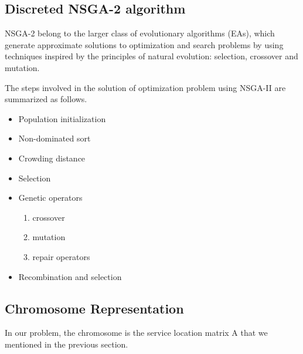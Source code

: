 \documentclass[twoside]{article}
\begin{document}
\subsection{Discreted NSGA-2 algorithm}
NSGA-2 belong to the larger class of evolutionary algorithms (EAs), which generate approximate solutions to 
optimization and search problems by using techniques inspired by the principles of natural 
evolution: selection, crossover and mutation.

The steps involved in the solution of optimization problem using NSGA-II are summarized as follows.
\begin{itemize}
	\item Population initialization
	\item Non-dominated sort
	\item Crowding distance
	\item Selection
	\item Genetic operators
		\begin{enumerate}
			\item crossover
			\item mutation
			\item repair operators
		\end{enumerate}
	\item Recombination and selection
\end{itemize}

\subsection{Chromosome Representation}
In our problem, the chromosome is the service location matrix A that we mentioned in the previous section. 
\end{document}
